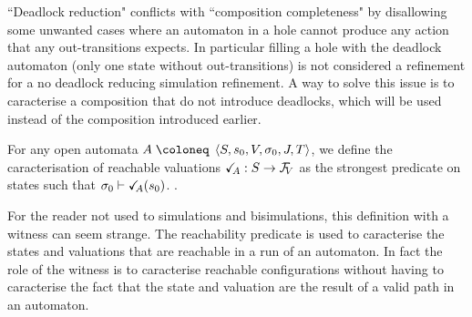 \documentclass{article}
\begin{document}

``Deadlock reduction" conflicts with ``composition completeness" by disallowing some unwanted cases where an automaton in a hole cannot produce any action that any out-transitions expects.
In particular filling a hole with the deadlock automaton (only one state without out-transitions) is not considered a refinement for a no deadlock reducing simulation refinement.
A way to solve this issue is to caracterise a composition that do not introduce deadlocks, which will be used instead of the composition introduced earlier.
\begin{defi}[Reachability]
For any open automata \(A \defobject \OA{S}{s_0}{V}{\sigma_0}{J}{T}\), we define the caracterisation of reachable valuations \(\reach{A}: S \to \rformulae[V]\) as the strongest predicate on states such that
 \(\sigma_0 \vdash \reach{A}\mpar{s_0}\).
 {}.
\end{defi}
For the reader not used to simulations and bisimulations, this definition with a witness can seem strange.
The reachability predicate is used to caracterise the states and valuations that are reachable in a run of an automaton.
In fact the role of the witness is to caracterise reachable configurations without having to caracterise the fact that the state and valuation are the result of a valid path in an automaton.
\end{document}

